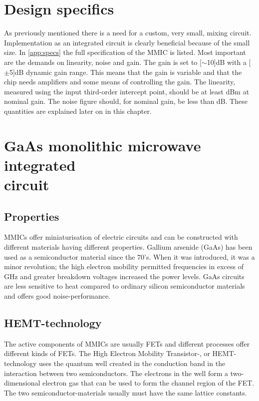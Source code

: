 	\section{Design specifics}
		As previously mentioned there is a need for a custom, very small, mixing circuit. Implementation as an integrated circuit is clearly beneficial because of the small size. In \autoref{app:specs} the full specification of the MMIC is listed. Most important are the demands on linearity, noise and gain. The gain is set to \unit[$\sim$10]{dB} with a \unit[$\pm$5]{dB} dynamic gain range. This means that the gain is variable and that the chip needs amplifiers and some means of controlling the gain. The linearity, measured using the input third-order intercept point, should be at least \unit[15]{dBm} at nominal gain. The noise figure should, for nominal gain, be less than \unit[15]{dB}. These quantities are explained later on in this chapter.


	\section{GaAs monolithic microwave integrated \\circuit}
		\subsection{Properties}

		MMICs offer miniaturisation of electric circuits and can be constructed with different materials having different properties. Gallium arsenide (GaAs) has been used as a semiconductor material since the 70's. When it was introduced, it was a minor revolution; the high electron mobility permitted frequencies in excess of \unit[200]{GHz} and greater breakdown voltages increased the power levels. GaAs circuits are less sensitive to heat compared to ordinary silicon semiconductor materials and offers good noise-performance.\autocite{robertson95} %

		\subsection{HEMT-technology}
			The active components of MMICs are usually FETs and different processes offer different kinds of FETs.	The High Electron Mobility Transistor-, or HEMT-technology uses the quantum well created in the conduction band in the interaction between two semiconductors. The electrons in the well form a two-dimensional electron gas that can be used to form the channel region of the FET.\autocite{mimura80} The two semiconductor-materials usually must have the same lattice constants.

